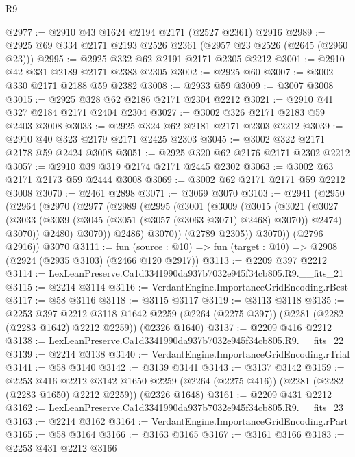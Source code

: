 \begin{lexlean}{R9}
\begin{coremodule}
@2977 := @2910 @43 @1624 @2194 @2171 (@2527 @2361) @2916
@2989 := @2925 @69 @334 @2171 @2193 @2526 @2361 (@2957 @23 @2526 (@2645 (@2960 @23)))
@2995 := @2925 @332 @62 @2191 @2171 @2305 @2212
@3001 := @2910 @42 @331 @2189 @2171 @2383 @2305
@3002 := @2925 @60
@3007 := @3002 @330 @2171 @2188 @59 @2382
@3008 := @2933 @59
@3009 := @3007 @3008
@3015 := @2925 @328 @62 @2186 @2171 @2304 @2212
@3021 := @2910 @41 @327 @2184 @2171 @2404 @2304
@3027 := @3002 @326 @2171 @2183 @59 @2403 @3008
@3033 := @2925 @324 @62 @2181 @2171 @2303 @2212
@3039 := @2910 @40 @323 @2179 @2171 @2425 @2303
@3045 := @3002 @322 @2171 @2178 @59 @2424 @3008
@3051 := @2925 @320 @62 @2176 @2171 @2302 @2212
@3057 := @2910 @39 @319 @2174 @2171 @2445 @2302
@3063 := @3002 @63 @2171 @2173 @59 @2444 @3008
@3069 := @3002 @62 @2171 @2171 @59 @2212 @3008
@3070 := @2461 @2898
@3071 := @3069 @3070
@3103 := @2941
    (@2950
      (@2964
        (@2970
          (@2977
            (@2989
              (@2995
                (@3001
                  (@3009
                    (@3015
                      (@3021
                        (@3027
                          (@3033
                            (@3039 (@3045 (@3051 (@3057 (@3063 @3071) @2468) @3070)) @2474)
                            @3070))
                        @2480)
                      @3070))
                  @2486)
                @3070))
            (@2789 @2305))
          @3070))
      (@2796 @2916))
    @3070
@3111 := fun (source : @10) => fun (target : @10) => @2908 (@2924 (@2935 @3103) (@2466 @120 @2917))
@3113 := @2209 @397 @2212
@3114 := LexLeanPreserve.Ca1d3341990da937b7032e945f34cb805.R9.__fits_21
@3115 := @2214 @3114
@3116 := VerdantEngine.ImportanceGridEncoding.rBest
@3117 := @58 @3116
@3118 := @3115 @3117
@3119 := @3113 @3118
@3135 := @2253
    @397
    @2212
    @3118
    @1642
    @2259
    (@2264 (@2275 @397))
    (@2281 (@2282 (@2283 @1642) @2212 @2259))
    (@2326 @1640)
@3137 := @2209 @416 @2212
@3138 := LexLeanPreserve.Ca1d3341990da937b7032e945f34cb805.R9.__fits_22
@3139 := @2214 @3138
@3140 := VerdantEngine.ImportanceGridEncoding.rTrial
@3141 := @58 @3140
@3142 := @3139 @3141
@3143 := @3137 @3142
@3159 := @2253
    @416
    @2212
    @3142
    @1650
    @2259
    (@2264 (@2275 @416))
    (@2281 (@2282 (@2283 @1650) @2212 @2259))
    (@2326 @1648)
@3161 := @2209 @431 @2212
@3162 := LexLeanPreserve.Ca1d3341990da937b7032e945f34cb805.R9.__fits_23
@3163 := @2214 @3162
@3164 := VerdantEngine.ImportanceGridEncoding.rPart
@3165 := @58 @3164
@3166 := @3163 @3165
@3167 := @3161 @3166
@3183 := @2253
    @431
    @2212
    @3166

\end{coremodule}
\end{lexlean}
